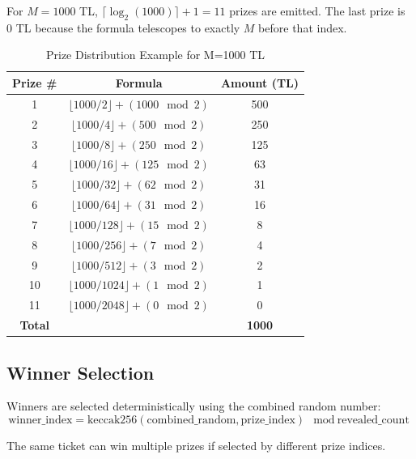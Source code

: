 \documentclass[12pt,a4paper]{article}
\begin{document}
For $M = 1000$ TL, $\lceil \log_2(1000) \rceil + 1 = 11$ prizes are
emitted. The last prize is $0$ TL because the formula telescopes to
exactly $M$ before that index.
\begin{table}[H]
    \centering
    \begin{tabular}{@{}ccc@{}}
        \toprule
        \textbf{Prize \#} & \textbf{Formula} & \textbf{Amount (TL)} \\
        \midrule
        1 & $\lfloor 1000/2 \rfloor + (1000 \mod 2)$ & 500 \\
        2 & $\lfloor 1000/4 \rfloor + (500 \mod 2)$ & 250 \\
        3 & $\lfloor 1000/8 \rfloor + (250 \mod 2)$ & 125 \\
        4 & $\lfloor 1000/16 \rfloor + (125 \mod 2)$ & 63 \\
        5 & $\lfloor 1000/32 \rfloor + (62 \mod 2)$ & 31 \\
        6 & $\lfloor 1000/64 \rfloor + (31 \mod 2)$ & 16 \\
        7 & $\lfloor 1000/128 \rfloor + (15 \mod 2)$ & 8 \\
        8 & $\lfloor 1000/256 \rfloor + (7 \mod 2)$ & 4 \\
        9 & $\lfloor 1000/512 \rfloor + (3 \mod 2)$ & 2 \\
        10 & $\lfloor 1000/1024 \rfloor + (1 \mod 2)$ & 1 \\
        11 & $\lfloor 1000/2048 \rfloor + (0 \mod 2)$ & 0 \\
        \midrule
        \textbf{Total} & & \textbf{1000} \\
        \bottomrule
    \end{tabular}
    \caption{Prize Distribution Example for M=1000 TL}
    \label{tab:prizes}
\end{table}

\subsection{Winner Selection}

Winners are selected deterministically using the combined random number:
\begin{equation}
    \text{winner\_index} = \text{keccak256}(\text{combined\_random}, \text{prize\_index}) \mod \text{revealed\_count}
\end{equation}

The same ticket can win multiple prizes if selected by different prize indices.
\end{document}
